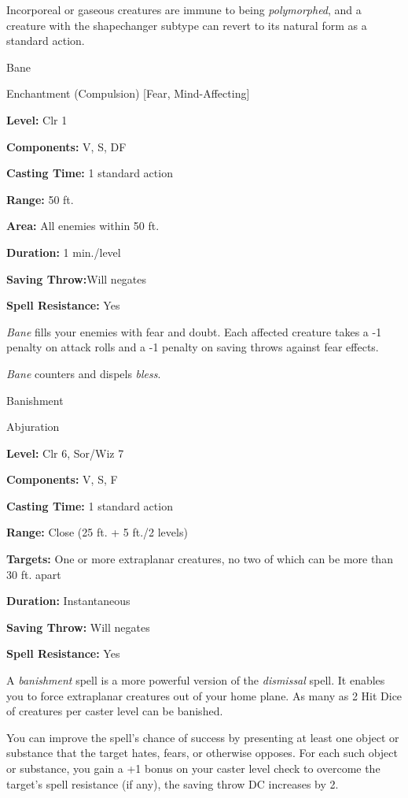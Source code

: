 \documentclass{article}
\begin{document}
Incorporeal or gaseous creatures are immune to being \textit{polymorphed}, and 
a creature with the shapechanger subtype can revert to its natural form as a standard 
action.

\vspace{12pt}
Bane

Enchantment (Compulsion) [Fear, Mind-Affecting]

\textbf{Level:} Clr 1

\textbf{Components:} V, S, DF

\textbf{Casting Time:} 1 standard action

\textbf{Range:} 50 ft.

\textbf{Area:} All enemies within 50 ft.

\textbf{Duration:} 1 min./level

\textbf{Saving Throw:}Will negates

\textbf{Spell Resistance:} Yes

\textit{Bane }fills your enemies with fear and doubt. Each affected creature takes 
a -1 penalty on attack rolls and a -1 penalty on saving throws against fear effects.

\textit{Bane }counters and dispels \textit{bless}.

\vspace{12pt}
Banishment

Abjuration

\textbf{Level:} Clr 6, Sor/Wiz 7

\textbf{Components:} V, S, F

\textbf{Casting Time:} 1 standard action

\textbf{Range:} Close (25 ft. + 5 ft./2 levels)

\textbf{Targets:} One or more extraplanar creatures, no two of which can be more 
than 30 ft. apart

\textbf{Duration:} Instantaneous

\textbf{Saving Throw: }Will negates

\textbf{Spell Resistance:} Yes

A \textit{banishment }spell is a more powerful version of the \textit{dismissal 
}spell. It enables you to force extraplanar creatures out of your home plane. As 
many as 2 Hit Dice of creatures per caster level can be banished.

You can improve the spell's chance of success by presenting at least one object 
or substance that the target hates, fears, or otherwise opposes. For each such 
object or substance, you gain a +1 bonus on your caster level check to overcome 
the target's spell resistance (if any), the saving throw DC increases by 2. 
\end{document}
